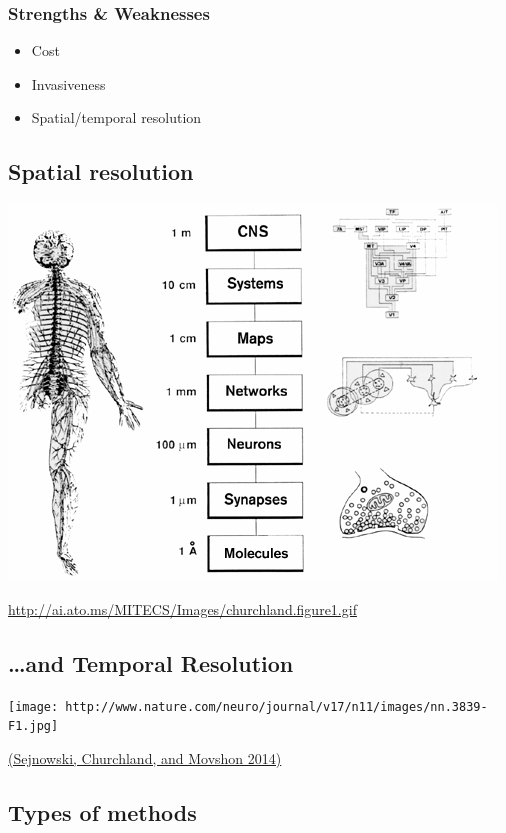 \documentclass[]{article}
\providecommand{\tightlist}{%
  \setlength{\itemsep}{0pt}\setlength{\parskip}{0pt}}
\begin{document}
\subsubsection{Strengths \& Weaknesses}\label{strengths-weaknesses}

\begin{itemize}
\tightlist
\item
  Cost
\item
  Invasiveness
\item
  Spatial/temporal resolution
\end{itemize}

\subsection{Spatial resolution}\label{spatial-resolution}

\includegraphics{img/churchland-levels-of-analysis.gif}

\url{http://ai.ato.ms/MITECS/Images/churchland.figure1.gif}

\subsection{\ldots{}and Temporal
Resolution}\label{and-temporal-resolution}


\texttt{[image: http://www.nature.com/neuro/journal/v17/n11/images/nn.3839-F1.jpg]}

\href{http://doi.org/10.1038/nn.3839}{(Sejnowski, Churchland, and
Movshon 2014)}

\subsection{Types of methods}\label{types-of-methods}
\end{document}
